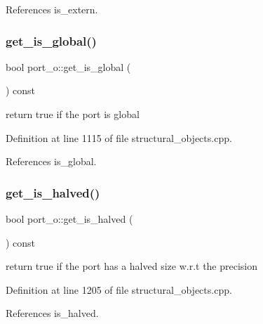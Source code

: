 References is\+\_\+extern.

\mbox{\label{structport__o_a2becd159f51389d709450683e536954c}} 
\subsubsection{\texorpdfstring{get\+\_\+is\+\_\+global()}{get\_is\_global()}}
{\footnotesize\ttfamily bool port\+\_\+o\+::get\+\_\+is\+\_\+global (\begin{DoxyParamCaption}{ }\end{DoxyParamCaption}) const}



return true if the port is global 



Definition at line 1115 of file structural\+\_\+objects.\+cpp.



References is\+\_\+global.

\mbox{\label{structport__o_ac7da78390613617e3f1be7b9f583cef9}} 
\subsubsection{\texorpdfstring{get\+\_\+is\+\_\+halved()}{get\_is\_halved()}}
{\footnotesize\ttfamily bool port\+\_\+o\+::get\+\_\+is\+\_\+halved (\begin{DoxyParamCaption}{ }\end{DoxyParamCaption}) const}



return true if the port has a halved size w.\+r.\+t the precision 



Definition at line 1205 of file structural\+\_\+objects.\+cpp.



References is\+\_\+halved.

\mbox{\label{structport__o_abaa71816b5d12be2039da28f35dbf28c}} 
